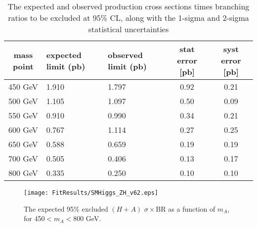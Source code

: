 \begin{table}
    \caption{The expected and observed production cross sections times branching ratios
        to be excluded at 95\% CL, along with the 1-sigma and 2-sigma statistical uncertainties 
    \label{tab:limitSensitivity}}
    \begin{tabular}{ c p{3.5cm} p{3.5cm} c c  } \hline \hline
        mass point & expected limit (pb) & observed limit (pb) & stat error [pb] & syst error [pb] \\ \hline 
        450 GeV & 1.910 & 1.797 & 0.92 & 0.21  \\
        500 GeV & 1.105 & 1.097 & 0.50 & 0.09  \\
        550 GeV & 0.910 & 0.990 & 0.34 & 0.21 \\
        600 GeV & 0.767 & 1.114 & 0.27 & 0.25 \\
        650 GeV & 0.588 & 0.659 & 0.19 & 0.19 \\
        700 GeV & 0.505 & 0.406 & 0.13 & 0.17 \\
        800 GeV & 0.335 & 0.250 & 0.10 & 0.10 \\


       \hline
    \end{tabular}
\end{table} 








\begin{figure}[hbt]
\center
\texttt{[image: FitResults/SMHiggs\_ZH\_v62.eps]}
\caption{The expected 95\% excluded $(H+A)$ $\sigma\times$BR as a function of $m_A$, 
for 450$<m_A<$800 GeV.
\label{fig:limitSensitivity}}
\end{figure}












